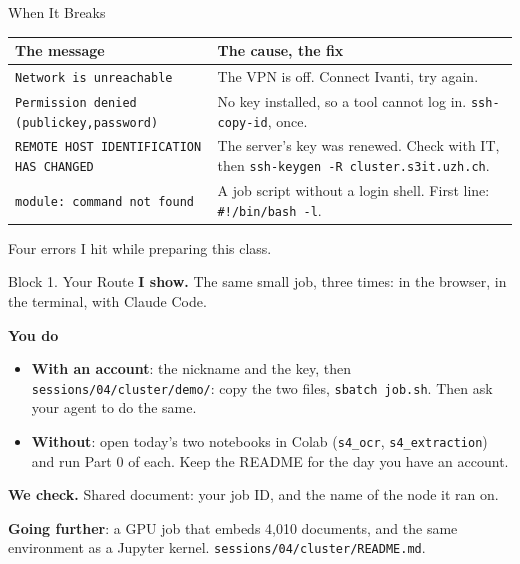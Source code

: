 \documentclass[svgnames,x11names,dvipsnames]{beamer}
\newcommand{\chg}[1]{{\bfseries #1}}
\renewcommand{\chg}[1]{#1}
\newcommand{\new}[1]{#1}
\begin{document}
\begin{frame}{\chg{When It Breaks}}
\footnotesize
\renewcommand{\arraystretch}{1.7}
\begin{tabular}{@{}>{\raggedright\arraybackslash}p{5.2cm}>{\raggedright\arraybackslash}p{5.2cm}@{}}
\toprule
\textbf{The message} & \textbf{The cause, the fix} \\
\midrule
\texttt{Network is unreachable} & The VPN is off. Connect Ivanti, try again. \\
\texttt{Permission denied (publickey,password)} & No key installed, so a tool cannot log in. \texttt{ssh-copy-id}, once. \\
\texttt{REMOTE HOST IDENTIFICATION HAS CHANGED} & The server's key was renewed. Check with IT, then \texttt{ssh-keygen -R cluster.s3it.uzh.ch}. \\
\texttt{module: command not found} & A job script without a login shell. First line: \texttt{\#!/bin/bash -l}. \\
\bottomrule
\end{tabular}

\vspace{0.4cm}
\small
Four errors I hit while preparing this class.
\end{frame}

\begin{frame}{\chg{Block 1. Your Route}}
\small
\textbf{I show.} The same small job, three times: in the browser, in the terminal, with Claude Code.

\vspace{0.4cm}
\textbf{You do}
\begin{itemize}
    \setlength{\itemsep}{4pt}
    \item \textbf{With an account}: the nickname and the key, then \texttt{sessions/04/cluster/demo/}: copy the two files, \texttt{sbatch job.sh}. Then ask your agent to do the same.
    \item \textbf{Without}: \new{open today's two notebooks in Colab (\texttt{s4\_ocr}, \texttt{s4\_extraction}) and run Part 0 of each.} Keep the README for the day you have an account.
\end{itemize}

\vspace{0.4cm}
\textbf{We check.} Shared document: your job ID, and the name of the node it ran on.

\vspace{0.4cm}
\textbf{Going further}: a GPU job that embeds 4,010 documents, and the same environment as a Jupyter kernel. \texttt{sessions/04/cluster/README.md}.
\end{frame}
\end{document}
